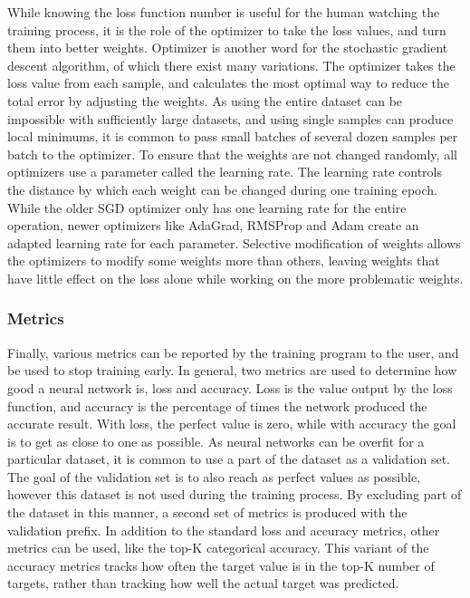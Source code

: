 While knowing the loss function number is useful for the human watching the training process, it is the role of the optimizer to take the loss values, and turn them into better weights.
Optimizer is another word for the stochastic gradient descent algorithm\cite{wiki:sgd}, of which there exist many variations.
The optimizer takes the loss value from each sample, and calculates the most optimal way to reduce the total error by adjusting the weights.
As using the entire dataset can be impossible with sufficiently large datasets, and using single samples can produce local minimums, it is common to pass small batches of several dozen samples per batch to the optimizer.
To ensure that the weights are not changed randomly, all optimizers use a parameter called the learning rate.
The learning rate controls the distance by which each weight can be changed during one training epoch.
While the older SGD optimizer only has one learning rate for the entire operation, newer optimizers like AdaGrad, RMSProp and Adam create an adapted learning rate for each parameter. 
Selective modification of weights allows the optimizers to modify some weights more than others, leaving weights that have little effect on the loss alone while working on the more problematic weights.

\subsubsection{Metrics}
Finally, various metrics can be reported by the training program to the user, and be used to stop training early.
In general, two metrics are used to determine how good a neural network is, loss and accuracy.
Loss is the value output by the loss function, and accuracy is the percentage of times the network produced the accurate result.
With loss, the perfect value is zero, while with accuracy the goal is to get as close to one as possible.
As neural networks can be overfit for a particular dataset, it is common to use a part of the dataset as a validation set.
The goal of the validation set is to also reach as perfect values as possible, however this dataset is not used during the training process.
By excluding part of the dataset in this manner, a second set of metrics is produced with the validation prefix.
In addition to the standard loss and accuracy metrics, other metrics can be used, like the top-K categorical accuracy.
This variant of the accuracy metrics tracks how often the target value is in the top-K number of targets, rather than tracking how well the actual target was predicted.

